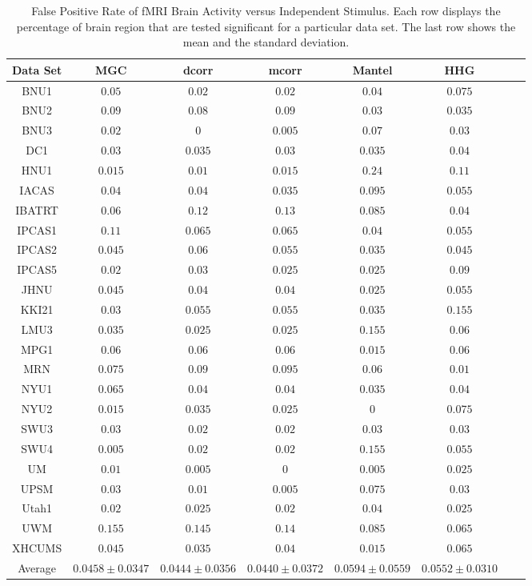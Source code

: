 \documentclass[11pt]{article}
\begin{document}
\begin{table}[!t]
\footnotesize
\renewcommand{\arraystretch}{0.5}
\centering
{\begin{tabular}{|c||c|c|c|c|c|c|c|}
\hline
Data Set & MGC & dcorr & mcorr & Mantel & HHG \\
\hline
BNU1  & $0.05$ & $0.02$ & $0.02$ & $0.04$ & $0.075$ \\
\hline
BNU2 & $0.09$ & $0.08$ & $0.09$  & $0.03$ & $0.035$\\
\hline
BNU3 & $0.02$ & $0$ & $0.005$  & $0.07$ & $0.03$\\
\hline
DC1 & $0.03$ & $0.035$ & $0.03$  & $0.035$ & $0.04$\\
\hline
HNU1 & $0.015$ & $0.01$ & $0.015$  & $0.24$ & $0.11$\\
\hline
IACAS & $0.04$ & $0.04$ & $0.035$  & $0.095$ & $0.055$\\
\hline
IBATRT & $0.06$ & $0.12$ & $0.13$  & $0.085$ & $0.04$\\
\hline
IPCAS1 & $0.11$ & $0.065$ & $0.065$  & $0.04$ & $0.055$\\
\hline
IPCAS2 & $0.045$ & $0.06$ & $0.055$  & $0.035$ & $0.045$\\
\hline
IPCAS5 & $0.02$ & $0.03$ & $0.025$  & $0.025$ & $0.09$\\
\hline
JHNU  & $0.045$ & $0.04$ & $0.04$ & $0.025$ & $0.055$ \\
\hline
KKI21  & $0.03$ & $0.055$ & $0.055$ & $0.035$ & $0.155$ \\
\hline
LMU3  & $0.035$ & $0.025$ & $0.025$ & $0.155$ & $0.06$ \\
\hline
MPG1  & $0.06$ & $0.06$ & $0.06$ & $0.015$ & $0.06$ \\
\hline
MRN  & $0.075$ & $0.09$ & $0.095$ & $0.06$ & $0.01$ \\
\hline
NYU1  & $0.065$ & $0.04$ & $0.04$ & $0.035$ & $0.04$ \\
\hline
NYU2  & $0.015$ & $0.035$ & $0.025$ & $0$ & $0.075$ \\
\hline
SWU3  & $0.03$ & $0.02$ & $0.02$ & $0.03$ & $0.03$ \\
\hline
SWU4  & $0.005$ & $0.02$ & $0.02$ & $0.155$ & $0.055$ \\
\hline
UM & $0.01$ & $0.005$ & $0$  & $0.005$ & $0.025$\\
\hline
UPSM & $0.03$ & $0.01$ & $0.005$  & $0.075$ & $0.03$\\
\hline
Utah1 & $0.02$ & $0.025$ & $0.02$  & $0.04$ & $0.025$\\
\hline
UWM & $0.155$ & $0.145$ & $0.14$  & $0.085$ & $0.065$\\
\hline
XHCUMS & $0.045$ & $0.035$ & $0.04$  & $0.015$ & $0.065$\\
\hline
\hline
Average & $0.0458 \pm 0.0347$ & $0.0444 \pm 0.0356$ & $0.0440 \pm 0.0372$  & $0.0594 \pm 0.0559$ & $0.0552 \pm 0.0310$\\
\hline
\end{tabular}
\caption{False Positive Rate of fMRI Brain Activity versus Independent Stimulus. 
Each row displays the percentage of brain region that are tested significant for a particular data set.
The last row shows the mean and the standard deviation. }
\label{table2}
}
\end{table}
\end{document}
